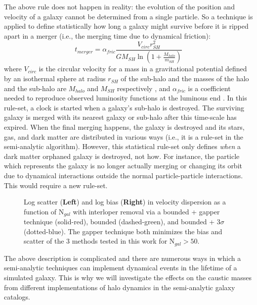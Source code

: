 \documentclass[iop]{emulateapj}
\begin{document}
The above rule does not happen in reality: the evolution of the position and velocity of a galaxy cannot be determined from a single particle. So a technique is applied to define statistically how long a galaxy might survive before it is ripped apart in a merger (i.e., the merging time due to dynamical friction):
\begin{equation}
t_{merger} = \alpha_{fric} \frac{V_{circ}r_{SH}^2}{GM_{SH}\ln \left (1+\frac{M_{halo}}{m_{SH}}\right )}
\label{eq:time_merger}
\end{equation}
where $V_{circ}$ is the circular velocity for a mass in a gravitational potential defined by an isothermal sphere at radius $r_{SH}$ of the sub-halo and the masses of the halo and the sub-halo are $M_{halo}$ and $M_{SH}$ respectively \citep{Binney87}, and $\alpha_{fric}$ is a coefficient needed to reproduce observed luminosity functions at the luminous end \citep{Guo11}. In this rule-set, a clock is started when a galaxy's sub-halo is destroyed. The surviving galaxy is merged with its nearest galaxy or sub-halo after this time-scale has expired. When the final merging happens, the galaxy is destroyed and its stars, gas, and dark matter are distributed in various ways (i.e., it is a rule-set in the semi-analytic algorithm). However, this statistical rule-set only defines {\it when} a dark matter orphaned galaxy is destroyed, not how. For instance, the particle which represents the galaxy is no longer actually merging or changing its orbit due to dynamical interactions outside the normal particle-particle interactions. This would require a new rule-set.

\begin{figure*}
 \caption{Log scatter ({\bf Left}) and log bias ({\bf Right}) in velocity dispersion as a function of N$_{gal}$ with interloper removal via a bounded + gapper technique (solid-red), bounded (dashed-green), and bounded + 3$\sigma$ (dotted-blue). The gapper technique both minimizes the bias and scatter of the 3 methods tested in this work for N$_{gal} > 50$.
\label{fig:interlop}}
\end{figure*}

The above description is complicated and there are numerous ways in which a semi-analytic techniques can implement dynamical events in the lifetime of a simulated galaxy. This is why we will investigate the effects on the caustic masses from different implementations of halo dynamics in the semi-analytic galaxy catalogs. 
\end{document}
